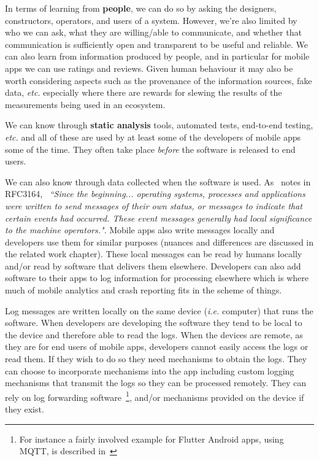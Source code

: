 In terms of learning from \textbf{people}, we can do so by asking the designers, constructors, operators, and users of a system. However, we're also limited by who we can ask, what they are willing/able to communicate, and whether that communication is sufficiently open and transparent to be useful and reliable. We can also learn from information produced by people, and in particular for mobile apps we can use ratings and reviews. Given human behaviour it may also be worth considering aspects such as the provenance of the information sources, fake data, \emph{etc.} especially where there are rewards for slewing the results of the measurements being used in an ecosystem. 

We can know through \textbf{static analysis} tools, automated tests, end-to-end testing, \emph{etc.} and all of these are used by at least some of the developers of mobile apps some of the time. They often take place \textit{before} the software is released to end users.

We can also know through data collected when the software is used. As~\cite{RFC3164} notes in RFC3164, ~\emph{``Since the beginning... operating systems, processes and applications were written to send messages of their own status, or messages to indicate that certain events had occurred. These event messages generally had local significance to the machine operators."}. Mobile apps also write messages locally and developers use them for similar purposes (nuances and differences are discussed in the related work chapter). These local messages can be read by humans locally and/or read by software that delivers them elsewhere. Developers can also add software to their apps to log information for processing elsewhere which is where much of mobile analytics and crash reporting fits in the scheme of things.

Log messages are written locally on the same device (\textit{i.e.} computer) that runs the software. When developers are developing the software they tend to be local to the device and therefore able to read the logs. When the devices are remote, as they are for end users of mobile apps, developers cannot easily access the logs or read them. If they wish to do so they need mechanisms to obtain the logs. They can choose to incorporate mechanisms into the app including custom logging mechanisms that transmit the logs so they can be processed remotely. They can rely on log forwarding software~\footnote{For instance a fairly involved example for Flutter Android apps, using MQTT, is described in~\citep{adil2020_sending_logs_from_flutter_apps}}, and/or mechanisms provided on the device if they exist. 


